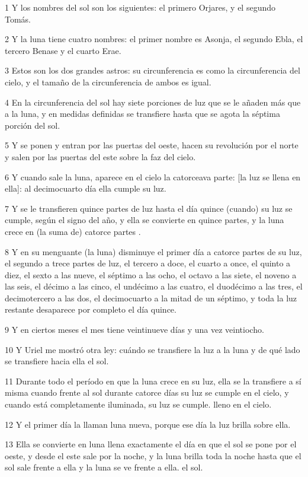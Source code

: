 \par 1 Y los nombres del sol son los siguientes: el primero Orjares, y el segundo Tomás.
\par 2 Y la luna tiene cuatro nombres: el primer nombre es Asonja, el segundo Ebla, el tercero Benase y el cuarto Erae.
\par 3 Estos son los dos grandes astros: su circunferencia es como la circunferencia del cielo, y el tamaño de la circunferencia de ambos es igual.
\par 4 En la circunferencia del sol hay siete porciones de luz que se le añaden más que a la luna, y en medidas definidas se transfiere hasta que se agota la séptima porción del sol.
\par 5 Y se ponen y entran por las puertas del oeste, hacen su revolución por el norte y salen por las puertas del este sobre la faz del cielo.
\par 6 Y cuando sale la luna, aparece en el cielo la catorceava parte: [la luz se llena en ella]: al decimocuarto día ella cumple su luz.
\par 7 Y se le transfieren quince partes de luz hasta el día quince (cuando) su luz se cumple, según el signo del año, y ella se convierte en quince partes, y la luna crece en (la suma de) catorce partes .
\par 8 Y en su menguante (la luna) disminuye el primer día a catorce partes de su luz, el segundo a trece partes de luz, el tercero a doce, el cuarto a once, el quinto a diez, el sexto a las nueve, el séptimo a las ocho, el octavo a las siete, el noveno a las seis, el décimo a las cinco, el undécimo a las cuatro, el duodécimo a las tres, el decimotercero a las dos, el decimocuarto a la mitad de un séptimo, y toda la luz restante desaparece por completo el día quince.
\par 9 Y en ciertos meses el mes tiene veintinueve días y una vez veintiocho.
\par 10 Y Uriel me mostró otra ley: cuándo se transfiere la luz a la luna y de qué lado se transfiere hacia ella el sol.
\par 11 Durante todo el período en que la luna crece en su luz, ella se la transfiere a sí misma cuando frente al sol durante catorce días su luz se cumple en el cielo, y cuando está completamente iluminada, su luz se cumple. lleno en el cielo.
\par 12 Y el primer día la llaman luna nueva, porque ese día la luz brilla sobre ella.
\par 13 Ella se convierte en luna llena exactamente el día en que el sol se pone por el oeste, y desde el este sale por la noche, y la luna brilla toda la noche hasta que el sol sale frente a ella y la luna se ve frente a ella. el sol.
